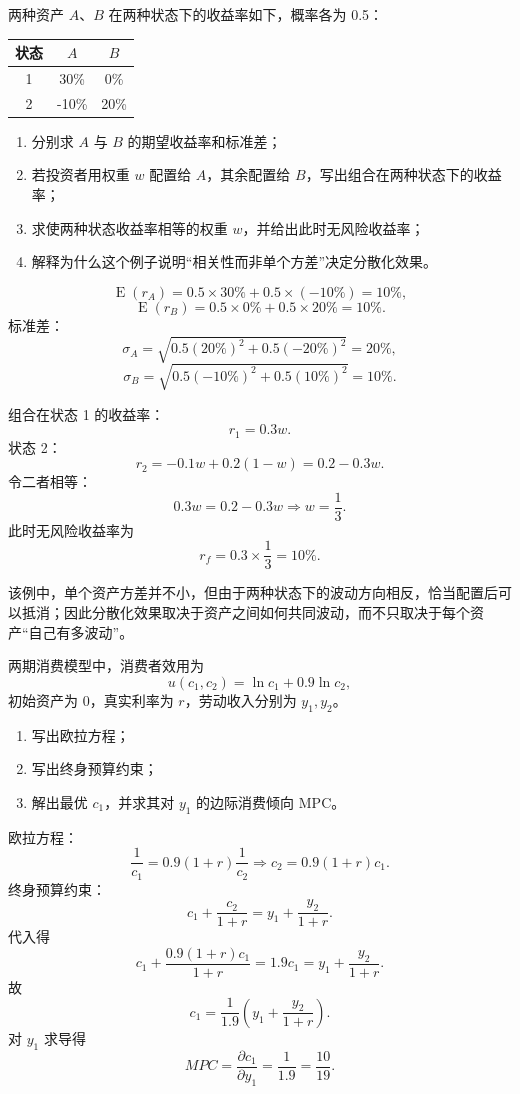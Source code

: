 \begin{question}
两种资产 $A$、$B$ 在两种状态下的收益率如下，概率各为 0.5：
\begin{center}
\begin{tabular}{c|cc}
状态 & $A$ & $B$\\\hline
1 & 30\% & 0\%\\
2 & -10\% & 20\%
\end{tabular}
\end{center}
\begin{enumerate}[label=(\alph*),leftmargin=2.5em]
  \item 分别求 $A$ 与 $B$ 的期望收益率和标准差；
  \item 若投资者用权重 $w$ 配置给 $A$，其余配置给 $B$，写出组合在两种状态下的收益率；
  \item 求使两种状态收益率相等的权重 $w$，并给出此时无风险收益率；
  \item 解释为什么这个例子说明“相关性而非单个方差”决定分散化效果。
\end{enumerate}
\begin{solution}
\[
\operatorname{E}(r_A)=0.5\times30\%+0.5\times(-10\%)=10\%,
\]
\[
\operatorname{E}(r_B)=0.5\times0\%+0.5\times20\%=10\%.
\]
标准差：
\[
\sigma_A=\sqrt{0.5(20\%)^2+0.5(-20\%)^2}=20\%,
\]
\[
\sigma_B=\sqrt{0.5(-10\%)^2+0.5(10\%)^2}=10\%.
\]

组合在状态 1 的收益率：
\[
r_1=0.3w.
\]
状态 2：
\[
r_2=-0.1w+0.2(1-w)=0.2-0.3w.
\]
令二者相等：
\[
0.3w=0.2-0.3w\Rightarrow w=\frac13.
\]
此时无风险收益率为
\[
r_f=0.3\times\frac13=10\%.
\]

该例中，单个资产方差并不小，但由于两种状态下的波动方向相反，恰当配置后可以抵消；因此分散化效果取决于资产之间如何共同波动，而不只取决于每个资产“自己有多波动”。
\end{solution}
\end{question}

\begin{question}
两期消费模型中，消费者效用为
\[
u(c_1,c_2)=\ln c_1+0.9\ln c_2,
\]
初始资产为 0，真实利率为 $r$，劳动收入分别为 $y_1,y_2$。
\begin{enumerate}[label=(\alph*),leftmargin=2.5em]
  \item 写出欧拉方程；
  \item 写出终身预算约束；
  \item 解出最优 $c_1$，并求其对 $y_1$ 的边际消费倾向 MPC。
\end{enumerate}
\begin{solution}
欧拉方程：
\[
\frac{1}{c_1}=0.9(1+r)\frac{1}{c_2}
\Rightarrow c_2=0.9(1+r)c_1.
\]
终身预算约束：
\[
c_1+\frac{c_2}{1+r}=y_1+\frac{y_2}{1+r}.
\]
代入得
\[
c_1+\frac{0.9(1+r)c_1}{1+r}=1.9c_1=y_1+\frac{y_2}{1+r}.
\]
故
\[
c_1=\frac{1}{1.9}\left(y_1+\frac{y_2}{1+r}\right).
\]
对 $y_1$ 求导得
\[
MPC=\frac{\partial c_1}{\partial y_1}=\frac{1}{1.9}=\frac{10}{19}.
\]
\end{solution}
\end{question}

